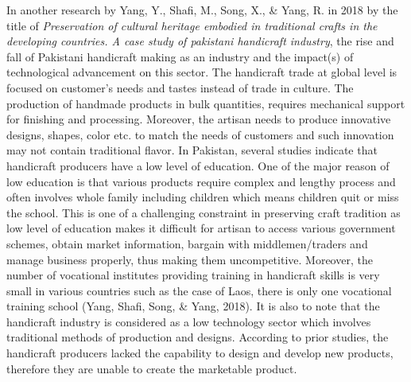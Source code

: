 In another research by Yang, Y., Shafi, M., Song, X., \& Yang, R. in 2018 by the title of \textit {Preservation of cultural heritage embodied in traditional crafts in the developing countries. A case study of pakistani handicraft industry}, the rise and fall of Pakistani handicraft making as an industry and the impact(s) of technological advancement on this sector. The handicraft trade at global level is focused on customer’s needs and tastes instead of trade in culture. The production of handmade products in bulk quantities, requires mechanical support for finishing and processing. Moreover, the artisan needs to produce innovative designs, shapes, color etc. to match the needs of customers and such innovation may not contain traditional flavor. In Pakistan, several studies indicate that handicraft producers have a low level of education. One of the major reason of low education is that various products require complex and lengthy process and often involves whole family including children which means children quit or miss the school. This is one of a challenging constraint in preserving craft tradition as low level of education makes it difficult for artisan to access various government schemes, obtain market information, bargain with middlemen/traders and manage business properly, thus making them uncompetitive. Moreover, the number of vocational institutes providing training in handicraft skills is very small in various countries such as the case of Laos, there is only one vocational training school (Yang, Shafi, Song, \& Yang, 2018). It is also to note  that the handicraft industry is considered as a low technology sector which involves traditional methods of production and designs. According to prior studies, the handicraft producers lacked the capability to design and develop new products, therefore they are unable to create the marketable product.

